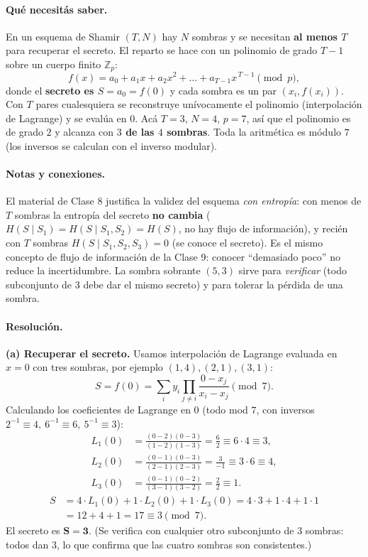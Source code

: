 \paragraph{Qué necesitás saber.}
En un esquema de Shamir $(T,N)$ hay $N$ sombras y se necesitan \textbf{al menos $T$} para
recuperar el secreto. El reparto se hace con un polinomio de grado $T-1$ sobre un cuerpo finito
$\mathbb{Z}_p$:
\begin{equation}
  f(x) = a_0 + a_1 x + a_2 x^2 + \dots + a_{T-1}x^{\,T-1} \pmod p,
\end{equation}
donde el \textbf{secreto es $S = a_0 = f(0)$} y cada sombra es un par $(x_i, f(x_i))$. Con $T$
pares cualesquiera se reconstruye unívocamente el polinomio (interpolación de Lagrange) y se
evalúa en $0$. Acá $T=3$, $N=4$, $p=7$, así que el polinomio es de grado $2$ y alcanza con
\textbf{$3$ de las $4$ sombras}. Toda la aritmética es módulo $7$ (los inversos se calculan
con el inverso modular).

\paragraph{Notas y conexiones.}
El material de Clase 8 justifica la validez del esquema \emph{con entropía}: con menos de $T$
sombras la entropía del secreto \textbf{no cambia} ($H(S\mid S_1)=H(S\mid S_1,S_2)=H(S)$, no hay
flujo de información), y recién con $T$ sombras $H(S\mid S_1,S_2,S_3)=0$ (se conoce el secreto).
Es el mismo concepto de flujo de información de la Clase 9: conocer ``demasiado poco'' no reduce
la incertidumbre. La sombra sobrante $(5,3)$ sirve para \emph{verificar} (todo subconjunto de $3$
debe dar el mismo secreto) y para tolerar la pérdida de una sombra.

\paragraph{Resolución.}
\textbf{(a) Recuperar el secreto.} Usamos interpolación de Lagrange evaluada en $x=0$ con tres
sombras, por ejemplo $(1,4),(2,1),(3,1)$:
\begin{equation}
  S = f(0) = \sum_{i} y_i \prod_{j\neq i} \frac{0 - x_j}{x_i - x_j} \pmod 7 .
\end{equation}
Calculando los coeficientes de Lagrange en $0$ (todo mod $7$, con inversos
$2^{-1}\equiv 4,\ 6^{-1}\equiv 6,\ 5^{-1}\equiv 3$):
\begin{align*}
  L_1(0) &= \frac{(0-2)(0-3)}{(1-2)(1-3)} = \frac{6}{2} \equiv 6\cdot 4 \equiv 3,\\
  L_2(0) &= \frac{(0-1)(0-3)}{(2-1)(2-3)} = \frac{3}{-1} \equiv 3\cdot 6 \equiv 4,\\
  L_3(0) &= \frac{(0-1)(0-2)}{(3-1)(3-2)} = \frac{2}{2} \equiv 1.
\end{align*}
\begin{align*}
  S &= 4\cdot L_1(0) + 1\cdot L_2(0) + 1\cdot L_3(0)
     = 4\cdot 3 + 1\cdot 4 + 1\cdot 1 \\
    &= 12 + 4 + 1 = 17 \equiv \boxed{3} \pmod 7 .
\end{align*}
El secreto es $\mathbf{S = 3}$. (Se verifica con cualquier otro subconjunto de $3$ sombras: todos
dan $3$, lo que confirma que las cuatro sombras son consistentes.)

